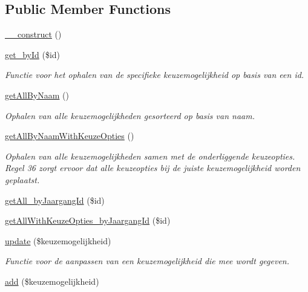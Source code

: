 \subsection*{Public Member Functions}
\begin{DoxyCompactItemize}
\item 
\mbox{\hyperlink{class_keuzemogelijkheid___model_a095c5d389db211932136b53f25f39685}{\+\_\+\+\_\+construct}} ()
\item 
\mbox{\hyperlink{class_keuzemogelijkheid___model_a98d28a4d9a29d40c5a8aa0176f19a919}{get\+\_\+by\+Id}} (\$id)
\begin{DoxyCompactList}\small\item\em Functie voor het ophalen van de specifieke keuzemogelijkheid op basis van een id. \end{DoxyCompactList}\item 
\mbox{\hyperlink{class_keuzemogelijkheid___model_a2b035b1ffd1cbe651b35bb3e53d72c09}{get\+All\+By\+Naam}} ()
\begin{DoxyCompactList}\small\item\em Ophalen van alle keuzemogelijkheden gesorteerd op basis van naam. \end{DoxyCompactList}\item 
\mbox{\hyperlink{class_keuzemogelijkheid___model_a2762d72d382c5c81da0d0830d5d91805}{get\+All\+By\+Naam\+With\+Keuze\+Opties}} ()
\begin{DoxyCompactList}\small\item\em Ophalen van alle keuzemogelijkheden samen met de onderliggende keuzeopties. Regel 36 zorgt ervoor dat alle keuzeopties bij de juiste keuzemogelijkheid worden geplaatst. \end{DoxyCompactList}\item 
\mbox{\hyperlink{class_keuzemogelijkheid___model_aa7334b3aaafdacd36e91e44a83e668c3}{get\+All\+\_\+by\+Jaargang\+Id}} (\$id)
\item 
\mbox{\hyperlink{class_keuzemogelijkheid___model_afee956c75c2fe9966783b18602ace19a}{get\+All\+With\+Keuze\+Opties\+\_\+by\+Jaargang\+Id}} (\$id)
\item 
\mbox{\hyperlink{class_keuzemogelijkheid___model_a933a162ba87e58d4cc7eb781fd571a7a}{update}} (\$keuzemogelijkheid)
\begin{DoxyCompactList}\small\item\em Functie voor de aanpassen van een keuzemogelijkheid die mee wordt gegeven. \end{DoxyCompactList}\item 
\mbox{\hyperlink{class_keuzemogelijkheid___model_ab3ea46c3ea11cbb463eb98238e38c580}{add}} (\$keuzemogelijkheid)

\end{DoxyCompactItemize}
